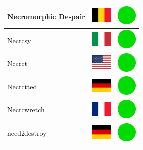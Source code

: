 \documentclass[12pt, a4paper, twoside]{report}
\begin{document}
\begin{center}
\begin{longtable}{|p{5cm}|p{2cm}|p{2cm}|}
 Necromorphic Despair                                       & \includegraphics[width=1cm]{../img/flags/be} &   \includegraphics[width=1cm]{../likes/y} \\ \hline
 Necrosy                                                    & \includegraphics[width=1cm]{../img/flags/it} &   \includegraphics[width=1cm]{../likes/y} \\ \hline
 Necrot                                                     & \includegraphics[width=1cm]{../img/flags/us} &   \includegraphics[width=1cm]{../likes/y} \\ \hline
 Necrotted                                                  & \includegraphics[width=1cm]{../img/flags/de} &   \includegraphics[width=1cm]{../likes/y} \\ \hline
 Necrowretch                                                & \includegraphics[width=1cm]{../img/flags/fr} &   \includegraphics[width=1cm]{../likes/y} \\ \hline
 need2destroy                                               & \includegraphics[width=1cm]{../img/flags/de} &   \includegraphics[width=1cm]{../likes/y} \\ \hline

\end{longtable}
\end{center}
\end{document}
